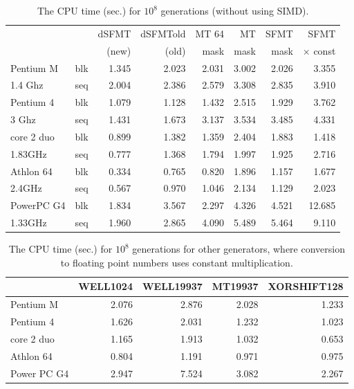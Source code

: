 \documentclass{svmult}
\begin{document}
\begin{table}
  \begin{center}
    \caption{The CPU time (sec.) for $10^8$ generations (without using SIMD).}
    \label{tab:speed-c}
    \begin{tabular}{|ll|r|r|r|r|r|r|} \hline
      &  & dSFMT & dSFMTold & MT 64 & MT & SFMT & SFMT \\
      &  &(new)&(old)& mask & mask & mask & $\times$ const \\ \hline\hline
      Pentium M & blk & 1.345 & 2.023 & 2.031 & 3.002 & 2.026 & 3.355 \\
      1.4 Ghz & seq & 2.004 & 2.386 & 2.579 & 3.308 & 2.835 & 3.910 \\ \hline
      Pentium 4 & blk & 1.079 & 1.128 & 1.432 & 2.515 & 1.929 & 3.762 \\
      3 Ghz & seq & 1.431 & 1.673 & 3.137 & 3.534 & 3.485 & 4.331 \\ \hline
      core 2 duo & blk & 0.899 & 1.382 & 1.359 & 2.404 & 1.883 & 1.418 \\
      1.83GHz & seq & 0.777 & 1.368 & 1.794 & 1.997 & 1.925 & 2.716 \\ \hline
      Athlon 64 & blk & 0.334 & 0.765 & 0.820 & 1.896 & 1.157 & 1.677 \\
      2.4GHz & seq & 0.567 & 0.970 & 1.046 & 2.134 & 1.129 & 2.023 \\ \hline
      PowerPC G4 & blk & 1.834 & 3.567 & 2.297 & 4.326 & 4.521 & 12.685 \\
      1.33GHz & seq & 1.960 & 2.865 & 4.090 & 5.489 & 5.464 & 9.110 \\ \hline
    \end{tabular}
  \end{center}
\end{table}

\begin{table}
  \begin{center}
    \caption{The CPU time (sec.) for $10^8$ generations for other generators,
       where conversion to floating point numbers uses constant multiplication.}
    \label{tab:speed-other}
    \begin{tabular}{|l|r|r|r|r|} \hline
      & WELL1024 & WELL19937 & MT19937 & XORSHIFT128 \\ \hline
      Pentium M & 2.076 & 2.876 & 2.028 & 1.233 \\
      Pentium 4 & 1.626 & 2.031 & 1.232 & 1.023 \\
      core 2 duo & 1.165 & 1.913 & 1.032 & 0.653 \\
      Athlon 64 & 0.804 & 1.191 & 0.971 & 0.975 \\
      Power PC G4 & 2.947 & 7.524 & 3.082 & 2.267 \\ \hline
    \end{tabular}
  \end{center}
\end{table}
\end{document}
